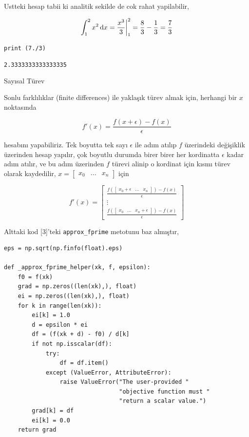 \documentclass[12pt,fleqn]{article}\usepackage{../../common}
\begin{document}
Ustteki hesap tabii ki analitik sekilde de cok rahat yapilabilir, 

$$
\int_{1}^{2} x^2 \,\mathrm{d} x = \frac{x^3}{3} \biggr|_{1}^{2} = 
\frac{8}{3}-\frac{1}{3} = 
\frac{7}{3}
$$

\begin{verbatim}
print (7./3)
\end{verbatim}

\begin{verbatim}
2.3333333333333335
\end{verbatim}

Sayısal Türev

Sonlu farklılıklar (finite differences) ile yaklaşık türev almak için,
herhangi bir $x$ noktasında

$$
f'(x) = \frac{f(x + \epsilon) - f(x)}{\epsilon}
$$

hesabını yapabiliriz. Tek boyutta tek sayı $\epsilon$ ile adım atılıp $f$
üzerindeki değişiklik üzerinden hesap yapılır, çok boyutlu durumda birer
birer her kordinatta $\epsilon$ kadar adım atılır, ve bu adım üzerinden $f$
türevi alinip o kordinat için kısmı türev olarak kaydedilir, $x =
\left[\begin{array}{ccc} x_0 & ... & x_n \end{array}\right]$ için

$$
f'(x) = \left[\begin{array}{c}
\frac{ f \left( [\begin{array}{ccc} x_0 + \epsilon & ... & x_n \end{array}]\right) - f(x)}{\epsilon} \\
\vdots \\
\frac{ f \left( [\begin{array}{ccc} x_0  & ... & x_n+\epsilon \end{array}]\right) - f(x)}{\epsilon} 
\end{array}\right]
$$

Alttaki kod [3]'teki \verb!approx_fprime! metotunu
baz almıştır, 

\begin{verbatim}
eps = np.sqrt(np.finfo(float).eps)

def _approx_fprime_helper(xk, f, epsilon):
    f0 = f(xk)
    grad = np.zeros((len(xk),), float)
    ei = np.zeros((len(xk),), float)
    for k in range(len(xk)):
        ei[k] = 1.0
        d = epsilon * ei
        df = (f(xk + d) - f0) / d[k]
        if not np.isscalar(df):
            try:
                df = df.item()
            except (ValueError, AttributeError):
                raise ValueError("The user-provided "
                                 "objective function must "
                                 "return a scalar value.")
        grad[k] = df
        ei[k] = 0.0
    return grad
\end{verbatim}
\end{document}

